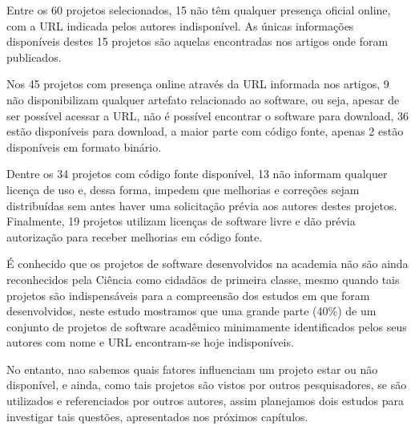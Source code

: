 Entre os 60 projetos selecionados, 15 não têm qualquer presença oficial online,
com a URL indicada pelos autores indisponível. As únicas informações
disponíveis destes 15 projetos são aquelas encontradas nos artigos onde foram
publicados.

Nos 45 projetos com presença online através da URL informada nos artigos, 9 não
disponibilizam qualquer artefato relacionado ao software, ou seja, apesar de
ser possível acessar a URL, não é possível encontrar o software para download,
36 estão disponíveis para download, a maior parte com código fonte, apenas 2
estão disponíveis em formato binário.

Dentre os 34 projetos com código fonte disponível, 13 não informam qualquer
licença de uso e, dessa forma, impedem que melhorias e correções
sejam distribuídas sem antes haver uma solicitação prévia aos autores destes
projetos. Finalmente, 19 projetos utilizam licenças de software livre e dão
prévia autorização para receber melhorias em código fonte.

É conhecido que os projetos de software desenvolvidos na academia não são ainda
reconhecidos pela Ciência como cidadãos de primeira classe, mesmo quando tais
projetos são indispensáveis para a compreensão dos estudos em que foram
desenvolvidos, neste estudo mostramos que uma grande parte (40\%) de um
conjunto de projetos de software acadêmico minimamente identificados pelos seus
autores com nome e URL encontram-se hoje indisponíveis.

No entanto, nao sabemos quais fatores influenciam um projeto estar ou não
disponível, e ainda, como tais projetos são vistos por outros pesquisadores, se
são utilizados e referenciados por outros autores, assim planejamos dois
estudos para investigar tais questões, apresentados nos próximos capítulos.




